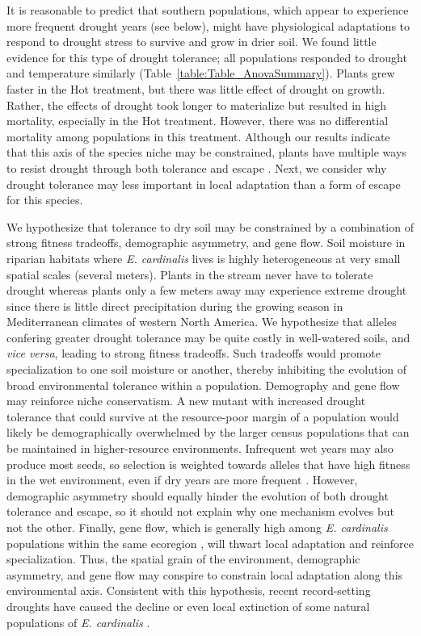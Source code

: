 \documentclass[11pt, oneside]{article}
\begin{document}
It is reasonable to predict that southern populations, which appear to experience more frequent drought years (see below), might have physiological adaptations to respond to drought stress to survive and grow in drier soil. We found little evidence for this type of drought tolerance; all populations responded to drought and temperature similarly (Table~\ref{table:Table_AnovaSummary}). Plants grew faster in the Hot treatment, but there was little effect of drought on growth. Rather, the effects of drought took longer to materialize but resulted in high mortality, especially in the Hot treatment. However, there was no differential mortality among populations in this treatment. Although our results indicate that this axis of the species niche may be constrained, plants have multiple ways to resist drought through both tolerance and escape \citep{Ludlow_1989, Kooyers_2015}. Next, we consider why drought tolerance may less important in local adaptation than a form of escape for this species.

We hypothesize that tolerance to dry soil may be constrained by a combination of strong fitness tradeoffs, demographic asymmetry, and gene flow. Soil moisture in riparian habitats where \textit{E. cardinalis} lives is highly heterogeneous at very small spatial scales (several meters). Plants in the stream never have to tolerate drought whereas plants only a few meters away may experience extreme drought since there is little direct precipitation during the growing season in Mediterranean climates of western North America. We hypothesize that alleles confering greater drought tolerance may be quite costly in well-watered soils, and \textit{vice versa}, leading to strong fitness tradeoffs. Such tradeoffs would promote specialization to one soil moisture or another, thereby inhibiting the evolution of broad environmental tolerance within a population. Demography and gene flow may reinforce niche conservatism. A new mutant with increased drought tolerance that could survive at the resource-poor margin of a population would likely be demographically overwhelmed by the larger census populations that can be maintained in higher-resource environments. Infrequent wet years may also produce most seeds, so selection is weighted towards alleles that have high fitness in the wet environment, even if dry years are more frequent \citep{Templeton_Levin_1979, Brown_Venable_1986}. However, demographic asymmetry should equally hinder the evolution of both drought tolerance and escape, so it should not explain why one mechanism evolves but not the other. Finally, gene flow, which is generally high among \textit{E. cardinalis} populations within the same ecoregion \citep{Paul_etal_2016}, will thwart local adaptation and reinforce specialization. Thus, the spatial grain of the environment, demographic asymmetry, and gene flow may conspire to constrain local adaptation along this environmental axis. Consistent with this hypothesis, recent record-setting droughts have caused the decline or even local extinction of some natural populations of \textit{E. cardinalis} \citep{Sheth_Angert_2017}.
\end{document}
